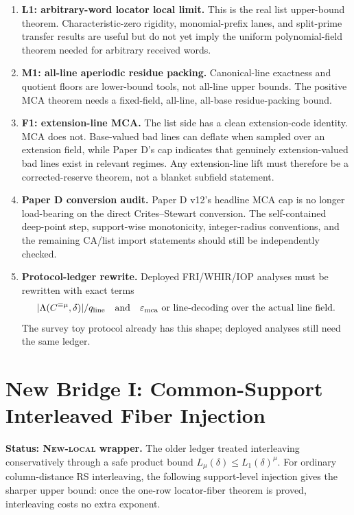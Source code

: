 \documentclass[11pt]{article}
\newcommand{\qline}{q_{\rm line}}
\newcommand{\epsmca}{\varepsilon_{\rm mca}}
\newcommand{\Lam}{\Lambda}
\begin{document}
\begin{enumerate}
\item \textbf{L1: arbitrary-word locator local limit.}  This is the real list
upper-bound theorem.  Characteristic-zero rigidity, monomial-prefix lanes, and
split-prime transfer results are useful but do not yet imply the uniform
polynomial-field theorem needed for arbitrary received words.

\item \textbf{M1: all-line aperiodic residue packing.}  Canonical-line exactness
and quotient floors are lower-bound tools, not all-line upper bounds.  The
positive MCA theorem needs a fixed-field, all-line, all-base residue-packing
bound.

\item \textbf{F1: extension-line MCA.}  The list side has a clean extension-code
identity.  MCA does not.  Base-valued bad lines can deflate when sampled over an
extension field, while Paper D's cap indicates that genuinely extension-valued
bad lines exist in relevant regimes.  Any extension-line lift must therefore be
a corrected-reserve theorem, not a blanket subfield statement.

\item \textbf{Paper D conversion audit.}  Paper D v12's headline MCA cap is no
longer load-bearing on the direct Crites--Stewart conversion.  The self-contained
deep-point step, support-wise monotonicity, integer-radius conventions, and the
remaining CA/list import statements should still be independently checked.

\item \textbf{Protocol-ledger rewrite.}  Deployed FRI/WHIR/IOP analyses must be
rewritten with exact terms
\[
  |\Lam(C^{\equiv\mu},\delta)|/\qline
  \quad\text{and}\quad
  \epsmca\text{ or line-decoding over the actual line field}.
\]
The survey toy protocol already has this shape; deployed analyses still need the
same ledger.
\end{enumerate}

\section{New Bridge I: Common-Support Interleaved Fiber Injection}
\label{sec:common-support-interleaved-fiber-injection}

\textbf{Status: \textsc{New-local} wrapper.}
The older ledger treated interleaving conservatively through a safe product
bound \(L_\mu(\delta)\le L_1(\delta)^\mu\).  For ordinary column-distance RS
interleaving, the following support-level injection gives the sharper upper
bound: once the one-row locator-fiber theorem is proved, interleaving costs no
extra exponent.
\end{document}
